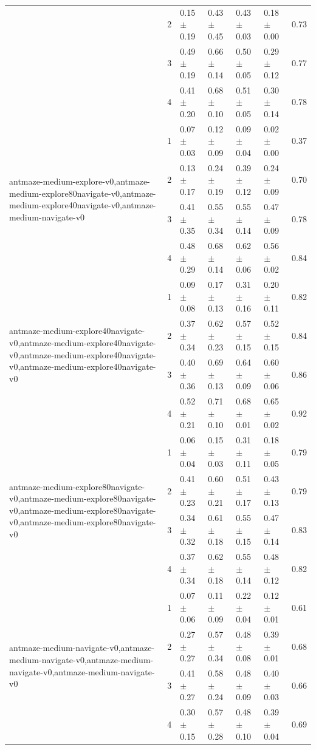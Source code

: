 \begin{tabular}{lllllll}
 & 2 & 0.15 $\pm$ 0.19 & 0.43 $\pm$ 0.45 & 0.43 $\pm$ 0.03 & 0.18 $\pm$ 0.00 & 0.73 \\
 & 3 & 0.49 $\pm$ 0.19 & 0.66 $\pm$ 0.14 & 0.50 $\pm$ 0.05 & 0.29 $\pm$ 0.12 & 0.77 \\
 & 4 & 0.41 $\pm$ 0.20 & 0.68 $\pm$ 0.10 & 0.51 $\pm$ 0.05 & 0.30 $\pm$ 0.14 & 0.78 \\
\cline{1-7}
\multirow[t]{4}{*}{antmaze-medium-explore-v0,antmaze-medium-explore80navigate-v0,antmaze-medium-explore40navigate-v0,antmaze-medium-navigate-v0} & 1 & 0.07 $\pm$ 0.03 & 0.12 $\pm$ 0.09 & 0.09 $\pm$ 0.04 & 0.02 $\pm$ 0.00 & 0.37 \\
 & 2 & 0.13 $\pm$ 0.17 & 0.24 $\pm$ 0.19 & 0.39 $\pm$ 0.12 & 0.24 $\pm$ 0.09 & 0.70 \\
 & 3 & 0.41 $\pm$ 0.35 & 0.55 $\pm$ 0.34 & 0.55 $\pm$ 0.14 & 0.47 $\pm$ 0.09 & 0.78 \\
 & 4 & 0.48 $\pm$ 0.29 & 0.68 $\pm$ 0.14 & 0.62 $\pm$ 0.06 & 0.56 $\pm$ 0.02 & 0.84 \\
\cline{1-7}
\multirow[t]{4}{*}{antmaze-medium-explore40navigate-v0,antmaze-medium-explore40navigate-v0,antmaze-medium-explore40navigate-v0,antmaze-medium-explore40navigate-v0} & 1 & 0.09 $\pm$ 0.08 & 0.17 $\pm$ 0.13 & 0.31 $\pm$ 0.16 & 0.20 $\pm$ 0.11 & 0.82 \\
 & 2 & 0.37 $\pm$ 0.34 & 0.62 $\pm$ 0.23 & 0.57 $\pm$ 0.15 & 0.52 $\pm$ 0.15 & 0.84 \\
 & 3 & 0.40 $\pm$ 0.36 & 0.69 $\pm$ 0.13 & 0.64 $\pm$ 0.09 & 0.60 $\pm$ 0.06 & 0.86 \\
 & 4 & 0.52 $\pm$ 0.21 & 0.71 $\pm$ 0.10 & 0.68 $\pm$ 0.01 & 0.65 $\pm$ 0.02 & 0.92 \\
\cline{1-7}
\multirow[t]{4}{*}{antmaze-medium-explore80navigate-v0,antmaze-medium-explore80navigate-v0,antmaze-medium-explore80navigate-v0,antmaze-medium-explore80navigate-v0} & 1 & 0.06 $\pm$ 0.04 & 0.15 $\pm$ 0.03 & 0.31 $\pm$ 0.11 & 0.18 $\pm$ 0.05 & 0.79 \\
 & 2 & 0.41 $\pm$ 0.23 & 0.60 $\pm$ 0.21 & 0.51 $\pm$ 0.17 & 0.43 $\pm$ 0.13 & 0.79 \\
 & 3 & 0.34 $\pm$ 0.32 & 0.61 $\pm$ 0.18 & 0.55 $\pm$ 0.15 & 0.47 $\pm$ 0.14 & 0.83 \\
 & 4 & 0.37 $\pm$ 0.34 & 0.62 $\pm$ 0.18 & 0.55 $\pm$ 0.14 & 0.48 $\pm$ 0.12 & 0.82 \\
\cline{1-7}
\multirow[t]{4}{*}{antmaze-medium-navigate-v0,antmaze-medium-navigate-v0,antmaze-medium-navigate-v0,antmaze-medium-navigate-v0} & 1 & 0.07 $\pm$ 0.06 & 0.11 $\pm$ 0.09 & 0.22 $\pm$ 0.04 & 0.12 $\pm$ 0.01 & 0.61 \\
 & 2 & 0.27 $\pm$ 0.27 & 0.57 $\pm$ 0.34 & 0.48 $\pm$ 0.08 & 0.39 $\pm$ 0.01 & 0.68 \\
 & 3 & 0.41 $\pm$ 0.27 & 0.58 $\pm$ 0.24 & 0.48 $\pm$ 0.09 & 0.40 $\pm$ 0.03 & 0.66 \\
 & 4 & 0.30 $\pm$ 0.15 & 0.57 $\pm$ 0.28 & 0.48 $\pm$ 0.10 & 0.39 $\pm$ 0.04 & 0.69 \\
\cline{1-7}
\bottomrule
\end{tabular}
